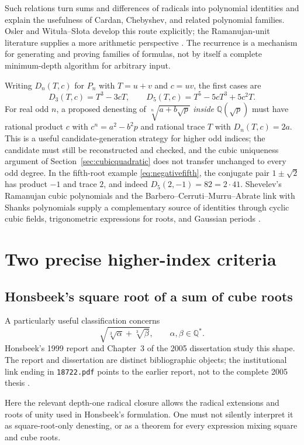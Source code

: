 \documentclass[11pt,oneside]{article}
\numberwithin{equation}{section}
\theoremstyle{definition}
\theoremstyle{remark}
\newcommand{\Q}{\mathbb{Q}}
\begin{document}
Such relations turn sums and differences of radicals into polynomial identities and explain the usefulness of Cardan, Chebyshev, and related polynomial families. Osler and Witu\l a--S\l ota develop this route explicitly; the Ramanujan-unit literature supplies a more arithmetic perspective \cite{osler,witula,berndt98}. The recurrence is a mechanism for generating and proving families of formulas, not by itself a complete minimum-depth algorithm for arbitrary input.

Writing $D_n(T,c)$ for $P_n$ with $T=u+v$ and $c=uv$, the first cases are
\[
D_3(T,c)=T^3-3cT,\qquad D_5(T,c)=T^5-5cT^3+5c^2T .
\]
For real odd $n$, a proposed denesting of $\sqrt[n]{a+b\sqrt p}$ \emph{inside} $\Q(\sqrt p)$ must have rational product $c$ with $c^n=a^2-b^2p$ and rational trace $T$ with $D_n(T,c)=2a$. This is a useful candidate-generation strategy for higher odd indices; the candidate must still be reconstructed and checked, and the cubic uniqueness argument of Section~\ref{sec:cubicquadratic} does not transfer unchanged to every odd degree. In the fifth-root example \eqref{eq:negativefifth}, the conjugate pair $1\pm\sqrt2$ has product $-1$ and trace $2$, and indeed $D_5(2,-1)=82=2\cdot41$. Shevelev's Ramanujan cubic polynomials and the Barbero--Cerruti--Murru--Abrate link with Shanks polynomials supply a complementary source of identities through cyclic cubic fields, trigonometric expressions for roots, and Gaussian periods \cite{shevelev,barbero}.

\section{Two precise higher-index criteria}\label{sec:highercriteria}

\subsection{Honsbeek's square root of a sum of cube roots}
A particularly useful classification concerns
\[
\sqrt{\sqrt[3]{\alpha}+\sqrt[3]{\beta}},
\qquad \alpha,\beta\in\Q^*.
\]
Honsbeek's 1999 report and Chapter~3 of the 2005 dissertation study this shape. The report and dissertation are distinct bibliographic objects; the institutional link ending in \texttt{18722.pdf} points to the earlier report, not to the complete 2005 thesis \cite{honsbeek99,honsbeek}.

Here the relevant depth-one radical closure allows the radical extensions and roots of unity used in Honsbeek's formulation. One must not silently interpret it as square-root-only denesting, or as a theorem for every expression mixing square and cube roots.
\end{document}
